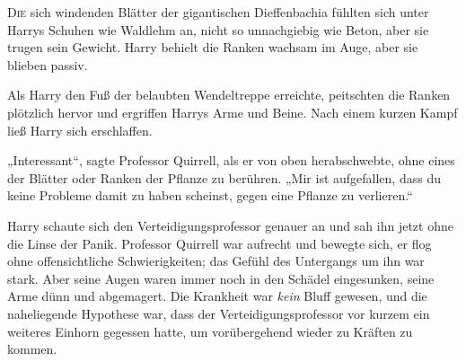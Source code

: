 
\lettrine{D}{ie} sich windenden Blätter der gigantischen Dieffenbachia fühlten sich unter Harrys Schuhen wie Waldlehm an, nicht so unnachgiebig wie Beton, aber sie trugen sein Gewicht. Harry behielt die Ranken wachsam im Auge, aber sie blieben passiv.

Als Harry den Fuß der belaubten Wendeltreppe erreichte, peitschten die Ranken plötzlich hervor und ergriffen Harrys Arme und Beine. Nach einem kurzen Kampf ließ Harry sich erschlaffen.

„Interessant“, sagte Professor Quirrell, als er von oben herabschwebte, ohne eines der Blätter oder Ranken der Pflanze zu berühren. „Mir ist aufgefallen, dass du keine Probleme damit zu haben scheinst, gegen eine Pflanze zu verlieren.“

Harry schaute sich den Verteidigungsprofessor genauer an und sah ihn jetzt ohne die Linse der Panik. Professor Quirrell war aufrecht und bewegte sich, er flog ohne offensichtliche Schwierigkeiten; das Gefühl des Untergangs um ihn war stark. Aber seine Augen waren immer noch in den Schädel eingesunken, seine Arme dünn und abgemagert. Die Krankheit war \emph{kein} Bluff gewesen, und die naheliegende Hypothese war, dass der Verteidigungsprofessor vor kurzem ein weiteres Einhorn gegessen hatte, um vorübergehend wieder zu Kräften zu kommen.

